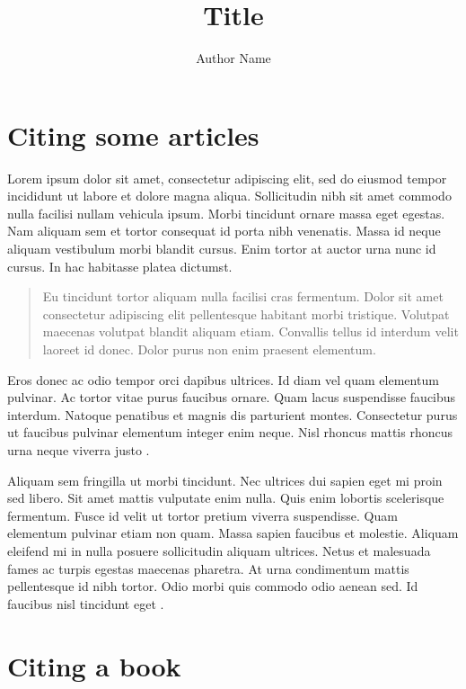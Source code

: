 \documentclass[a4paper]{article}
\title{Title}
\author{Author Name}
\date{\DTMdate{2023-10-31}}
\begin{document}
\maketitle

\section{Citing some articles}

Lorem ipsum dolor sit amet, consectetur adipiscing elit, sed do eiusmod tempor incididunt ut labore et dolore magna aliqua. Sollicitudin nibh sit amet commodo nulla facilisi nullam vehicula ipsum. Morbi tincidunt ornare massa eget egestas. Nam aliquam sem et tortor consequat id porta nibh venenatis. Massa id neque aliquam vestibulum morbi blandit cursus. Enim tortor at auctor urna nunc id cursus. In hac habitasse platea dictumst.

\begin{quote}
	Eu tincidunt tortor aliquam nulla facilisi cras fermentum. Dolor sit amet consectetur adipiscing elit pellentesque habitant morbi tristique. Volutpat maecenas volutpat blandit aliquam etiam. Convallis tellus id interdum velit laoreet id donec. Dolor purus non enim praesent elementum.
\end{quote}

Eros donec ac odio tempor orci dapibus ultrices. Id diam vel quam elementum pulvinar. Ac tortor vitae purus faucibus ornare. Quam lacus suspendisse faucibus interdum. Natoque penatibus et magnis dis parturient montes. Consectetur purus ut faucibus pulvinar elementum integer enim neque. Nisl rhoncus mattis rhoncus urna neque viverra justo \autocite{future-sex}.

\bigskip

Aliquam sem fringilla ut morbi tincidunt. Nec ultrices dui sapien eget mi proin sed libero. Sit amet mattis vulputate enim nulla. Quis enim lobortis scelerisque fermentum. Fusce id velit ut tortor pretium viverra suspendisse. Quam elementum pulvinar etiam non quam. Massa sapien faucibus et molestie. Aliquam eleifend mi in nulla posuere sollicitudin aliquam ultrices. Netus et malesuada fames ac turpis egestas maecenas pharetra. At urna condimentum mattis pellentesque id nibh tortor. Odio morbi quis commodo odio aenean sed. Id faucibus nisl tincidunt eget \autocite{nonverbal-overload}.

\section{Citing a book}
\end{document}
